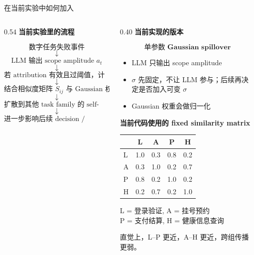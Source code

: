 \documentclass[aspectratio=169]{beamer}
\begin{document}
\begin{frame}[t]{在当前实验中如何加入}
\scriptsize
\begin{columns}[T]
\begin{column}{0.54\textwidth}
\textbf{当前实验里的流程}

\vspace{0.05cm}
\[
\text{数字任务失败事件}
\]
\[
\downarrow
\]
\[
\text{LLM 输出 scope amplitude } a_t
\]
\[
\downarrow
\]
\[
\text{若 attribution 有效且过阈值，计算 } A_t=\beta U_t a_t
\]
\[
\downarrow
\]
\[
\text{结合相似度矩阵 } S_{ij} \text{ 与 Gaussian 权重分配}
\]
\[
\downarrow
\]
\[
\text{扩散到其他 task family 的 self-efficacy}
\]
\[
\downarrow
\]
\[
\text{进一步影响后续 decision / attempt / outcome}
\]
\end{column}

\begin{column}{0.40\textwidth}
\textbf{当前实现的版本}

\[
\textbf{单参数 Gaussian spillover}
\]

\begin{itemize}
    \setlength{\itemsep}{0.1em}
    \item LLM 只输出 scope amplitude
    \item \(\sigma\) 先固定，不让 LLM 参与；后续再决定是否加入可变 \(\sigma\)
    \item Gaussian 权重会做归一化
\end{itemize}

\vspace{0.02cm}
\textbf{当前代码使用的 fixed similarity matrix}

\centering
\renewcommand{\arraystretch}{0.92}
\begin{tabular}{@{}lcccc@{}}
\toprule
 & L & A & P & H \\
\midrule
L & 1.0 & 0.3 & 0.8 & 0.2 \\
A & 0.3 & 1.0 & 0.2 & 0.7 \\
P & 0.8 & 0.2 & 1.0 & 0.2 \\
H & 0.2 & 0.7 & 0.2 & 1.0 \\
\bottomrule
\end{tabular}

\vspace{0.03cm}
\raggedright
{\tiny
L = 登录验证, A = 挂号预约\\
P = 支付结算, H = 健康信息查询
}

\vspace{0.02cm}
{\tiny
直觉上，L--P 更近，A--H 更近，跨组传播更弱。
}
\end{column}
\end{columns}
\end{frame}
\end{document}
